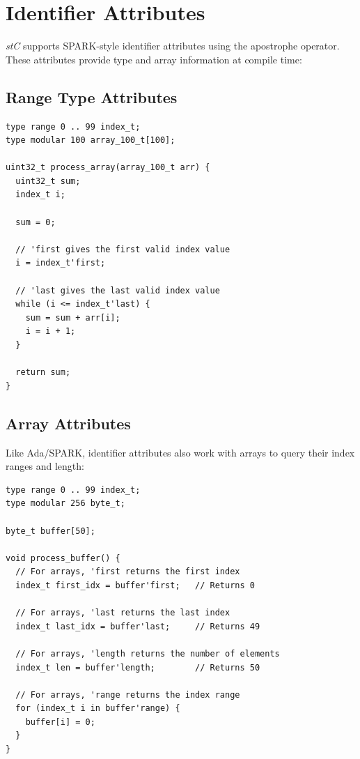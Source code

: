 \documentclass[11pt,letterpaper,twoside,openany]{book}
\begin{document}
\section{Identifier Attributes}

\emph{stC} supports SPARK-style identifier attributes using the apostrophe operator. These attributes provide type and array information at compile time:

\subsection{Range Type Attributes}

\begin{lstlisting}
type range 0 .. 99 index_t;
type modular 100 array_100_t[100];

uint32_t process_array(array_100_t arr) {
  uint32_t sum;
  index_t i;

  sum = 0;

  // 'first gives the first valid index value
  i = index_t'first;

  // 'last gives the last valid index value
  while (i <= index_t'last) {
    sum = sum + arr[i];
    i = i + 1;
  }

  return sum;
}
\end{lstlisting}

\subsection{Array Attributes}

Like Ada/SPARK, identifier attributes also work with arrays to query their index ranges and length:

\begin{lstlisting}
type range 0 .. 99 index_t;
type modular 256 byte_t;

byte_t buffer[50];

void process_buffer() {
  // For arrays, 'first returns the first index
  index_t first_idx = buffer'first;   // Returns 0

  // For arrays, 'last returns the last index
  index_t last_idx = buffer'last;     // Returns 49

  // For arrays, 'length returns the number of elements
  index_t len = buffer'length;        // Returns 50

  // For arrays, 'range returns the index range
  for (index_t i in buffer'range) {
    buffer[i] = 0;
  }
}
\end{lstlisting}
\end{document}
